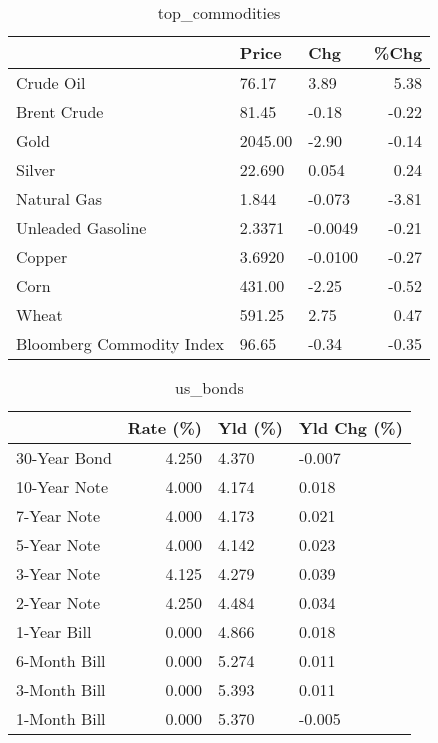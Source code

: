\documentclass{article}%
\begin{document}
\begin{table}[htbp]%
\caption{top\_commodities}%
\centering%
\begin{adjustbox}{width=1\textwidth}%
\begin{tabular}{lllr}
\toprule
                          &   Price &     Chg &  \%Chg \\
\midrule
               Crude Oil  &   76.17 &    3.89 &  5.38 \\
             Brent Crude  &   81.45 &   -0.18 & -0.22 \\
                    Gold  & 2045.00 &   -2.90 & -0.14 \\
                  Silver  &  22.690 &   0.054 &  0.24 \\
             Natural Gas  &   1.844 &  -0.073 & -3.81 \\
       Unleaded Gasoline  &  2.3371 & -0.0049 & -0.21 \\
                  Copper  &  3.6920 & -0.0100 & -0.27 \\
                    Corn  &  431.00 &   -2.25 & -0.52 \\
                   Wheat  &  591.25 &    2.75 &  0.47 \\
Bloomberg Commodity Index &   96.65 &   -0.34 & -0.35 \\
\bottomrule
\end{tabular}
%
\end{adjustbox}%
\end{table}

%


\begin{table}[htbp]%
\caption{us\_bonds}%
\centering%
\begin{adjustbox}{width=1\textwidth}%
\begin{tabular}{lrll}
\toprule
             &  Rate (\%) & Yld (\%) & Yld Chg (\%) \\
\midrule
30-Year Bond &     4.250 &   4.370 &      -0.007 \\
10-Year Note &     4.000 &   4.174 &       0.018 \\
 7-Year Note &     4.000 &   4.173 &       0.021 \\
 5-Year Note &     4.000 &   4.142 &       0.023 \\
 3-Year Note &     4.125 &   4.279 &       0.039 \\
 2-Year Note &     4.250 &   4.484 &       0.034 \\
 1-Year Bill &     0.000 &   4.866 &       0.018 \\
6-Month Bill &     0.000 &   5.274 &       0.011 \\
3-Month Bill &     0.000 &   5.393 &       0.011 \\
1-Month Bill &     0.000 &   5.370 &      -0.005 \\
\bottomrule
\end{tabular}
%
\end{adjustbox}%
\end{table}
\end{document}
